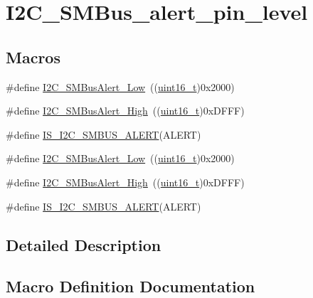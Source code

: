 \hypertarget{group___i2_c___s_m_bus__alert__pin__level}{}\section{I2\+C\+\_\+\+S\+M\+Bus\+\_\+alert\+\_\+pin\+\_\+level}
\label{group___i2_c___s_m_bus__alert__pin__level}
\subsection*{Macros}
\begin{DoxyCompactItemize}
\item 
\#define \hyperlink{group___i2_c___s_m_bus__alert__pin__level_ga6f923166107afb8aad1d7d1a87048d6e}{I2\+C\+\_\+\+S\+M\+Bus\+Alert\+\_\+\+Low}~((\hyperlink{_p_e___types_8h_a1f1825b69244eb3ad2c7165ddc99c956}{uint16\+\_\+t})0x2000)
\item 
\#define \hyperlink{group___i2_c___s_m_bus__alert__pin__level_gac3ab64f43ef90f0f83f9c88981aaa862}{I2\+C\+\_\+\+S\+M\+Bus\+Alert\+\_\+\+High}~((\hyperlink{_p_e___types_8h_a1f1825b69244eb3ad2c7165ddc99c956}{uint16\+\_\+t})0x\+D\+F\+F\+F)
\item 
\#define \hyperlink{group___i2_c___s_m_bus__alert__pin__level_ga61b0c91563eb4bd598329241fe7d3bb4}{I\+S\+\_\+\+I2\+C\+\_\+\+S\+M\+B\+U\+S\+\_\+\+A\+L\+E\+RT}(A\+L\+E\+RT)
\item 
\#define \hyperlink{group___i2_c___s_m_bus__alert__pin__level_ga6f923166107afb8aad1d7d1a87048d6e}{I2\+C\+\_\+\+S\+M\+Bus\+Alert\+\_\+\+Low}~((\hyperlink{_p_e___types_8h_a1f1825b69244eb3ad2c7165ddc99c956}{uint16\+\_\+t})0x2000)
\item 
\#define \hyperlink{group___i2_c___s_m_bus__alert__pin__level_gac3ab64f43ef90f0f83f9c88981aaa862}{I2\+C\+\_\+\+S\+M\+Bus\+Alert\+\_\+\+High}~((\hyperlink{_p_e___types_8h_a1f1825b69244eb3ad2c7165ddc99c956}{uint16\+\_\+t})0x\+D\+F\+F\+F)
\item 
\#define \hyperlink{group___i2_c___s_m_bus__alert__pin__level_ga61b0c91563eb4bd598329241fe7d3bb4}{I\+S\+\_\+\+I2\+C\+\_\+\+S\+M\+B\+U\+S\+\_\+\+A\+L\+E\+RT}(A\+L\+E\+RT)
\end{DoxyCompactItemize}


\subsection{Detailed Description}


\subsection{Macro Definition Documentation}
